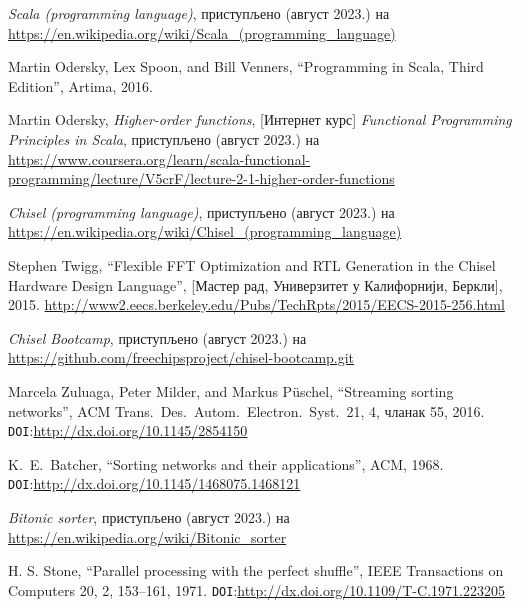 \documentclass[12pt, a4paper]{article}
\theoremstyle{definition}
\begin{document}
\begin{thebibliography}{99}

\textit{Scala (programming language)}, приступљено (август 2023.) на
\url{https://en.wikipedia.org/wiki/Scala_(programming_language)}

  Martin Odersky, Lex Spoon, and Bill Venners,
  ``Programming in Scala, Third Edition'',
  Artima, 2016.

Martin Odersky, \textit{Higher-order functions}, [Интернет курс] \textit{Functional Programming Principles in Scala}, приступљено (август 2023.) на
\url{https://www.coursera.org/learn/scala-functional-programming/lecture/V5crF/lecture-2-1-higher-order-functions}

\textit{Chisel (programming language)}, приступљено (август 2023.) на
\url{https://en.wikipedia.org/wiki/Chisel_(programming_language)}


  Stephen Twigg,
  ``Flexible FFT Optimization and RTL Generation in the Chisel Hardware Design Language'', [Мастер рад, Универзитет у Калифорнији, Беркли], 2015.
  \url{http://www2.eecs.berkeley.edu/Pubs/TechRpts/2015/EECS-2015-256.html}

\textit{Chisel Bootcamp}, приступљено (август 2023.) на
\url{https://github.com/freechipsproject/chisel-bootcamp.git}

  Marcela Zuluaga, Peter Milder, and Markus Püschel,
  ``Streaming sorting networks'',
  ACM Trans.\ Des.\ Autom.\ Electron.\ Syst.\ 21, 4, чланак 55, 2016.
  \verb+DOI+:\url{http://dx.doi.org/10.1145/2854150}

  K.\ E.\ Batcher,
  ``Sorting networks and their applications'',
  ACM, 1968.
  \verb+DOI+:\url{http://dx.doi.org/10.1145/1468075.1468121}

\textit{Bitonic sorter}, приступљено (август 2023.) на
\url{https://en.wikipedia.org/wiki/Bitonic_sorter}

  H. S. Stone,
  ``Parallel processing with the perfect shuffle'',
  IEEE Transactions on Computers 20, 2, 153–161, 1971.
  \verb+DOI+:\url{http://dx.doi.org/10.1109/T-C.1971.223205}


\end{thebibliography}
\end{document}
